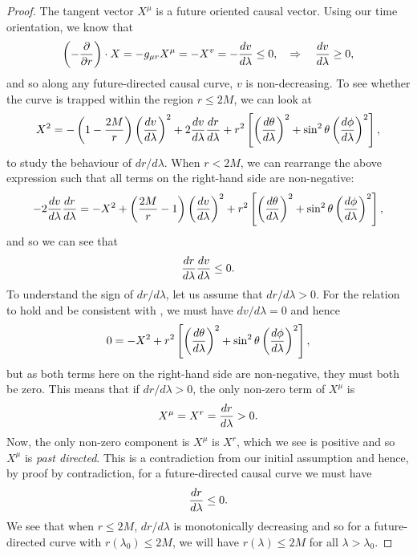 \begin{proof}
	The tangent vector $X^\mu$ is a future oriented causal vector. Using our time orientation, we know that
	\begin{equation}
	\label{eq:bhregionproof1}
		\left(- \frac{\partial }{\partial r}\right) \cdot X = - g_{\mu r} X^\mu = - X^v = - \frac{d v}{d \lambda} \leq 0, \quad \Rightarrow \quad \frac{d v}{d \lambda} \geq 0,
	\end{equation}
	and so along any future-directed causal curve, $v$ is non-decreasing. To see whether the curve is trapped within the region $r \leq 2M$, we can look at
	\begin{equation*}
		X^2 = - \left(1 - \frac{2M}{r} \right) \left(\frac{d v}{d \lambda} \right)^2 + 2 \frac{d v}{d \lambda} \frac{d r}{d \lambda} + r^2 \left[ \left(\frac{d \theta}{d \lambda} \right)^2 + \sin^2\theta \left(\frac{d \phi}{d \lambda} \right)^2 \right],
	\end{equation*}
	to study the behaviour of $dr / d\lambda$. When $r < 2M$, we can rearrange the above expression such that all terms on the right-hand side are non-negative:
	\begin{equation*}
		- 2 \frac{d v}{d \lambda} \frac{d r}{d \lambda} = - X^2 + \left(\frac{2M}{r} - 1\right) \left(\frac{d v}{d \lambda} \right)^2  + r^2 \left[ \left(\frac{d \theta}{d \lambda} \right)^2 + \sin^2\theta \left(\frac{d \phi}{d \lambda} \right)^2 \right],
	\end{equation*}
	and so we can see that
	\begin{equation}
	\label{eq:bhregionproof2}	
		\frac{d r}{d \lambda} \frac{d v}{d \lambda} \leq 0.
	\end{equation}
	To understand the sign of $dr / d\lambda$, let us assume that $dr / d\lambda > 0$. For the relation  to hold and be consistent with , we must have $dv / d\lambda = 0$ and hence
	\begin{equation*}
		0 = -X^2 + r^2 \left[ \left(\frac{d \theta}{d \lambda} \right)^2 + \sin^2\theta \left(\frac{d \phi}{d \lambda} \right)^2 \right],
	\end{equation*}
	but as both terms here on the right-hand side are non-negative, they must both be zero. This means that if $dr / d\lambda > 0$, the only non-zero term of $X^\mu$ is
	\begin{equation*}
		X^\mu = X^r = \frac{d r}{d \lambda} > 0.
	\end{equation*}
	Now, the only non-zero component is $X^\mu$ is $X^r$, which we see is positive and so $X^\mu$ is \emph{past directed}. This is a contradiction from our initial assumption and hence, by proof by contradiction, for a future-directed causal curve we must have
	\begin{equation*}
		\frac{d r}{d \lambda} \leq 0.
	\end{equation*}
	We see that when $r \leq 2M$, $dr / d\lambda$ is monotonically decreasing and so for a future-directed curve with $r(\lambda_0) \leq 2M$, we will have $r(\lambda) \leq 2M$ for all $\lambda > \lambda_0$.
\end{proof}

